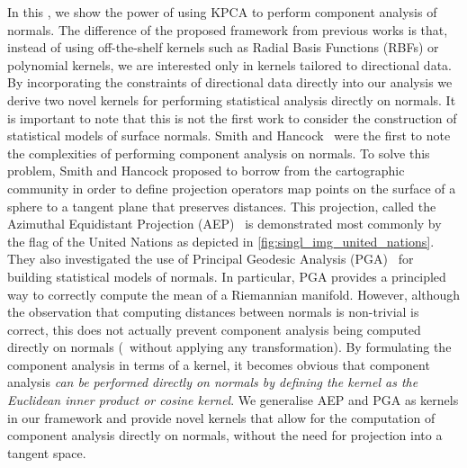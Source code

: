 In this , we show the power of using KPCA to perform
component analysis of normals. The difference of the proposed framework from
previous works is that, instead of using off-the-shelf kernels such as Radial
Basis Functions (RBFs) or polynomial kernels, we are interested only in kernels
tailored to directional data. By incorporating the constraints of directional
data directly into our analysis we derive two novel kernels for performing
statistical analysis directly on normals. It is important to note that this is
not the first work to consider the construction of statistical models of surface
normals. Smith and Hancock~\cite{smith2006recovering,smith2008facial} were the
first to note the complexities of performing component analysis on normals. To
solve this problem, Smith and Hancock proposed to borrow from the cartographic
community in order to define projection operators map points on the surface of a
sphere to a tangent plane that preserves distances. This projection, called the
Azimuthal Equidistant Projection (AEP)~\cite{snyder1987map} is demonstrated most
commonly by the flag of the United Nations as depicted in
\cref{fig:singl_img_united_nations}. They also investigated the use of Principal
Geodesic Analysis (PGA)~\cite{fletcher2004principal,smith2008facial} for
building statistical models of normals. In particular, PGA provides a principled
way to correctly compute the mean of a Riemannian manifold. However, although
the observation that computing distances between normals is non-trivial is
correct, this does not actually prevent component analysis being computed
directly on normals (\ie~without applying any transformation). By formulating
the component analysis in terms of a kernel, it becomes obvious that component
analysis \textit{can be performed directly on normals by defining the kernel as
the Euclidean inner product or cosine kernel}. We generalise AEP and PGA as
kernels in our framework and provide novel kernels that allow for the
computation of component analysis directly on normals, without the need for
projection into a tangent space.

